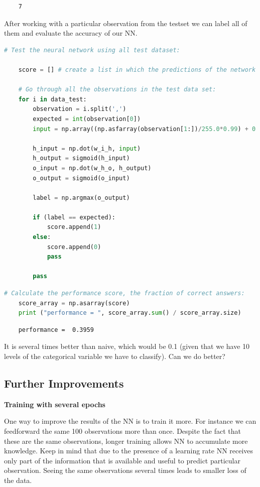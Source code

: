 \begin{lstlisting}
    7
\end{lstlisting}

After working with a particular observation from the testset we can label all of them and evaluate the accuracy of our NN.

\begin{lstlisting}[language=Python]   
    # Test the neural network using all test dataset:
    
    score = [] # create a list in which the predictions of the network will we saved.
    
    # Go through all the observations in the test data set:
    for i in data_test:
        observation = i.split(',')
        expected = int(observation[0])
        input = np.array((np.asfarray(observation[1:])/255.0*0.99) + 0.01, ndmin=2).T
    
        h_input = np.dot(w_i_h, input)
        h_output = sigmoid(h_input)
        o_input = np.dot(w_h_o, h_output)
        o_output = sigmoid(o_input)
    
        label = np.argmax(o_output)
    
        if (label == expected):
            score.append(1)
        else:
            score.append(0)
            pass
        
        pass
\end{lstlisting}

\begin{lstlisting}[language=Python]   
    # Calculate the performance score, the fraction of correct answers:
    score_array = np.asarray(score)
    print ("performance = ", score_array.sum() / score_array.size)
    \end{lstlisting}

\begin{lstlisting}
    performance =  0.3959
\end{lstlisting}

  It is several times better than naive, which would be 0.1 (given that we have 10 levels of the categorical variable we have to classify). Can we do better?
  
\subsection{Further Improvements}

\textbf{Training with several epochs}
   
One way to improve the results of the NN is to train it more. For instance we can feedforward the same 100 observations more than once. Despite the fact that these are the same observations, longer training allows NN to accumulate more knowledge. Keep in mind that due to the presence of a learning rate NN receives only part of the information that is available and useful to predict particular observation. Seeing the same observations several times leads to smaller loss of the data.
   
